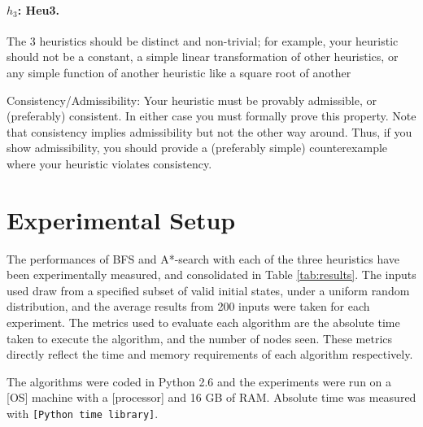 \documentclass[runningheads]{llncs}
\begin{document}
\paragraph{$h_3$: Heu3.}
The 3 heuristics should be distinct and non-trivial; for example, your heuristic should not be a constant, a simple linear transformation of other heuristics, or any simple function of another heuristic like a square root of another

Consistency/Admissibility: Your heuristic must be provably admissible, or (preferably) consistent. In either case you must formally prove this property. Note that consistency implies admissibility but not the other way around. Thus, if you show admissibility, you should provide a (preferably simple) counterexample where your heuristic violates consistency.



\section{Experimental Setup}
The performances of BFS and A*-search with each of the three heuristics have been experimentally measured, and consolidated in Table \ref{tab:results}. The inputs used draw from a specified subset of valid initial states, under a uniform random distribution, and the average results from 200 inputs were taken for each experiment. The metrics used to evaluate each algorithm are the absolute time taken to execute the algorithm, and the number of nodes seen. These metrics directly reflect the time and memory requirements of each algorithm respectively.

The algorithms were coded in Python 2.6 and the experiments were run on a [OS] machine with a [processor] and 16 GB of RAM. Absolute time was measured with \texttt{[Python time library]}.
\end{document}
